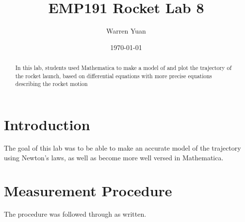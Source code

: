 \documentclass[a4paper,11pt]{article}
\title{\vspace{-2.0cm}EMP191 Rocket Lab 8}
\author{Warren Yuan}
\date{\today}
\begin{document}
    
    \maketitle
    
    \begin{abstract}
     {In this lab, students used Mathematica to make a model of and plot the trajectory of the rocket launch, based on differential equations with more precise equations describing the rocket motion}
    \end{abstract}
    
    \section{Introduction}
    {\quad The goal of this lab was to be able to make an accurate model of the trajectory using Newton's laws, as well as become more well versed in Mathematica.}
    
    \section{Measurement Procedure}
    {\quad The procedure was followed through as written.}
    
    
\end{document}
